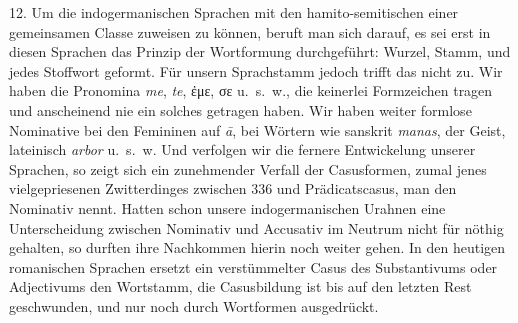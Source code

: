 \label{IV.III.II.4.12}12. Um die indogermanischen Sprachen mit den hamito-semitischen einer gemeinsamen  Classe zuweisen zu können, beruft man sich darauf, es sei erst in diesen Sprachen das Prinzip der Wortformung durchgeführt: Wurzel, Stamm,  und jedes Stoffwort geformt. Für unsern Sprachstamm jedoch trifft das nicht zu. Wir haben die Pronomina \textit{me}, \textit{te}, ἐμε, σε u.~s.~w., die keinerlei Formzeichen tragen und anscheinend nie ein solches getragen haben. Wir haben weiter formlose Nominative bei den Femininen auf \textit{ā}, bei Wörtern wie sanskrit \textit{manas}, der Geist, lateinisch \textit{arbor} u.~s.~w. Und verfolgen wir die fernere Entwickelung unserer Sprachen, so zeigt sich ein zunehmender Verfall der Casusformen, zumal jenes vielgepriesenen Zwitterdinges zwischen 336{\textbar}\label{fp.336} und Prädicatscasus,  man den Nominativ nennt. Hatten schon unsere indogermanischen Urahnen eine Unterscheidung zwischen Nominativ und Accusativ im Neutrum nicht für nöthig gehalten, so durften ihre Nachkommen hierin noch weiter gehen. In den heutigen romanischen Sprachen ersetzt ein verstümmelter Casus des Substantivums oder Adjectivums den Wortstamm, die Casusbildung ist bis auf den letzten Rest geschwunden, und nur noch  durch Wortformen ausgedrückt.


